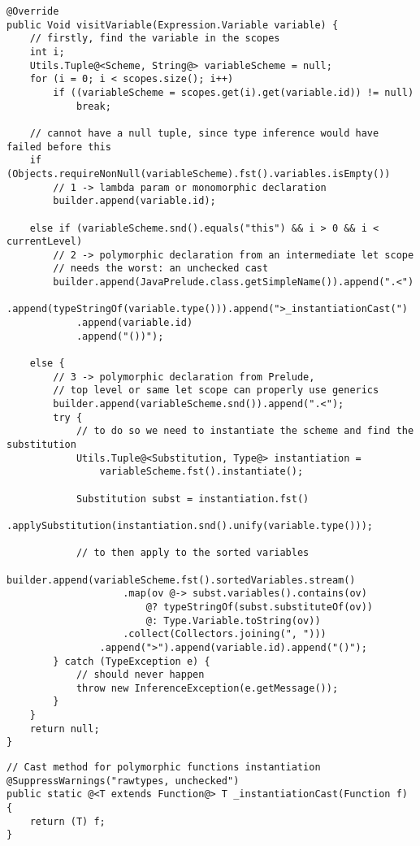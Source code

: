 \begin{lstlisting}[caption={Metodo \texttt{visit} per le variabili}, style=javaCode, label={lst:5-14-visit-variable-java}]
@Override
public Void visitVariable(Expression.Variable variable) {
    // firstly, find the variable in the scopes
    int i;
    Utils.Tuple@<Scheme, String@> variableScheme = null;
    for (i = 0; i < scopes.size(); i++)
        if ((variableScheme = scopes.get(i).get(variable.id)) != null)
            break;

    // cannot have a null tuple, since type inference would have failed before this
    if (Objects.requireNonNull(variableScheme).fst().variables.isEmpty())
        // 1 -> lambda param or monomorphic declaration
        builder.append(variable.id);

    else if (variableScheme.snd().equals("this") && i > 0 && i < currentLevel)
        // 2 -> polymorphic declaration from an intermediate let scope 
        // needs the worst: an unchecked cast
        builder.append(JavaPrelude.class.getSimpleName()).append(".<")
            .append(typeStringOf(variable.type())).append(">_instantiationCast(")
            .append(variable.id)
            .append("())");

    else {
        // 3 -> polymorphic declaration from Prelude,
        // top level or same let scope can properly use generics
        builder.append(variableScheme.snd()).append(".<");
        try {
            // to do so we need to instantiate the scheme and find the substitution
            Utils.Tuple@<Substitution, Type@> instantiation =
                variableScheme.fst().instantiate();

            Substitution subst = instantiation.fst()
                .applySubstitution(instantiation.snd().unify(variable.type()));

            // to then apply to the sorted variables
            builder.append(variableScheme.fst().sortedVariables.stream()
                    .map(ov @-> subst.variables().contains(ov)
                        @? typeStringOf(subst.substituteOf(ov))
                        @: Type.Variable.toString(ov))
                    .collect(Collectors.joining(", ")))
                .append(">").append(variable.id).append("()");
        } catch (TypeException e) {
            // should never happen
            throw new InferenceException(e.getMessage());
        }
    }
    return null;
}
\end{lstlisting}
\vspace{4mm}
\begin{lstlisting}[caption={Metodo di istanziazione con \textit{cast}}, style=javaCode, label={lst:5-14-instantiation-cast-java}]
// Cast method for polymorphic functions instantiation
@SuppressWarnings("rawtypes, unchecked")
public static @<T extends Function@> T _instantiationCast(Function f) {
    return (T) f;
}
\end{lstlisting}

